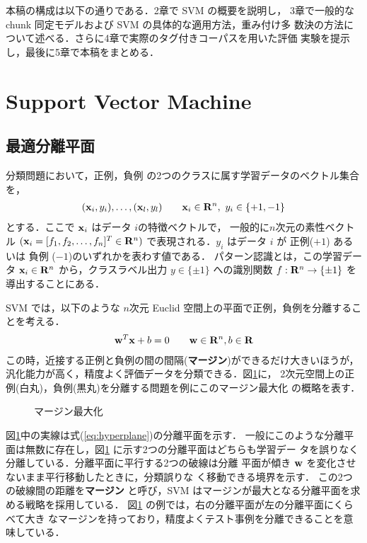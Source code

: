 本稿の構成は以下の通りである．2章で SVM の概要を説明し，
3章で一般的な chunk 同定モデルおよび SVM の具体的な適用方法，重み付け多
数決の方法について述べる．さらに4章で実際のタグ付きコーパスを用いた評価
実験を提示し，最後に5章で本稿をまとめる．

\section{Support Vector Machine}
\subsection{最適分離平面}
分類問題において，正例，負例 の2つのクラスに属す学習データのベクトル集合を，
\begin{eqnarray*}
({\bf x}_i,y_i), \ldots, ({\bf x}_l,y_l) \qquad  {\bf x}_i \in {\bf R}^n,\,\, y_i \in \{+1,-1\}
\end{eqnarray*}
とする．ここで ${\bf x}_i$ はデータ $i$の特徴ベクトルで，
一般的に$n$次元の素性ベクトル $({\bf x}_i =[f_1,f_2,\ldots,f_n]^T \in
{\bf R}^n)$ で表現される．$y_i$ はデータ $i$ が 正例($+1$) あるいは 負例
($-1$)のいずれかを表わす値である． パターン認識とは，この学習データ ${\bf x}_i \in
{\bf R}^n$ から，クラスラベル出力 $y \in\{\pm 1\}$ への識別関数 
$f: {\bf R}^n \rightarrow \{\pm 1\}$ を導出することにある．

SVM では，以下のような $n$次元 Euclid 空間上の平面で正例，負例を分離することを考える．
\begin{eqnarray}
{\bf w}^T {\bf x} + b = 0 \qquad {\bf w} \in {\bf R}^n, b \in {\bf R} \label{eq:hyperplane}
\end{eqnarray}
この時，近接する正例と負例の間の間隔({\bf マージン})ができるだけ大きいほうが，
汎化能力が高く，精度よく評価データを分類できる．図\ref{fig:hyperplane}に，
2次元空間上の正例(白丸)，負例(黒丸)を分離する問題を例にこのマージン最大化
の概略を表す．
\begin{figure}
   \begin{center}
    \epsfxsize=7cm
    
    \caption{マージン最大化}
    \label{fig:hyperplane}
   \end{center}
\end{figure}
図\ref{fig:hyperplane}中の実線は式(\ref{eq:hyperplane})の分離平面を示す．
一般にこのような分離平面は無数に存在し，図\ref{fig:hyperplane} に示す2つの分離平面はどちらも学習デー
タを誤りなく分離している．分離平面に平行する2つの破線は分離
平面が傾き ${\bf w}$ を変化させないまま平行移動したときに，分類誤りな
く移動できる境界を示す． この2つの破線間の距離を{\bf マージン}
と呼び，SVM はマージンが最大となる分離平面を求める戦略を採用している．
図\ref{fig:hyperplane} の例では，右の分離平面が左の分離平面にくらべて大き
なマージンを持っており，精度よくテスト事例を分離できることを意味している．

